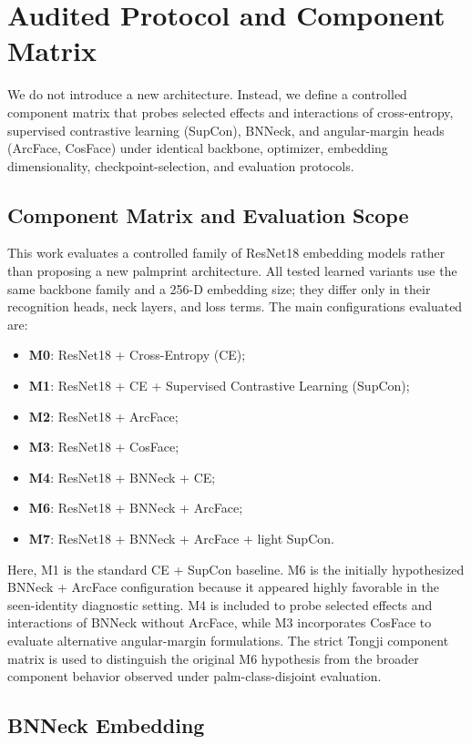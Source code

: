 \section{Audited Protocol and Component Matrix}

We do not introduce a new architecture. Instead, we define a controlled component matrix that probes selected effects and interactions of cross-entropy, supervised contrastive learning (SupCon), BNNeck, and angular-margin heads (ArcFace, CosFace) under identical backbone, optimizer, embedding dimensionality, checkpoint-selection, and evaluation protocols.

\subsection{Component Matrix and Evaluation Scope}

This work evaluates a controlled family of ResNet18 embedding models rather than proposing a new palmprint architecture. All tested learned variants use the same backbone family and a 256-D embedding size; they differ only in their recognition heads, neck layers, and loss terms. The main configurations evaluated are:
\begin{itemize}
    \item \textbf{M0}: ResNet18 + Cross-Entropy (CE);
    \item \textbf{M1}: ResNet18 + CE + Supervised Contrastive Learning (SupCon);
    \item \textbf{M2}: ResNet18 + ArcFace;
    \item \textbf{M3}: ResNet18 + CosFace;
    \item \textbf{M4}: ResNet18 + BNNeck + CE;
    \item \textbf{M6}: ResNet18 + BNNeck + ArcFace;
    \item \textbf{M7}: ResNet18 + BNNeck + ArcFace + light SupCon.
\end{itemize}
Here, M1 is the standard CE + SupCon baseline. M6 is the initially hypothesized BNNeck + ArcFace configuration because it appeared highly favorable in the seen-identity diagnostic setting. M4 is included to probe selected effects and interactions of BNNeck without ArcFace, while M3 incorporates CosFace to evaluate alternative angular-margin formulations. The strict Tongji component matrix is used to distinguish the original M6 hypothesis from the broader component behavior observed under palm-class-disjoint evaluation.

\subsection{BNNeck Embedding}

